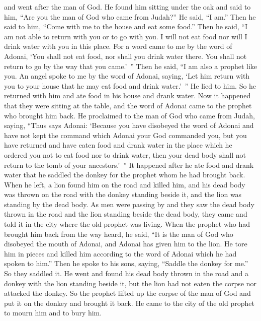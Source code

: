 \begin{biblechapter}
\verse and went after the man of God. He found him sitting under the oak and said to him, “Are you the man of God who came from Judah?” He said, “I am.”
\verse Then he said to him, “Come with me to the house and eat some food.”
\verse Then he said, “I am not able to return with you or to go with you. I will not eat food nor will I drink water with you in this place.
\verse For a word came to me by the word of Adonai, ‘You shall not eat food, nor shall you drink water there. You shall not return to go by the way that you came.’ ”
\verse Then he said, “I am also a prophet like you. An angel spoke to me by the word of Adonai, saying, ‘Let him return with you to your house that he may eat food and drink water.’ ” He lied to him.
\verse So he returned with him and ate food in his house and drank water.
\verse Now it happened that they were sitting at the table, and the word of Adonai came to the prophet who brought him back.
\verse He proclaimed to the man of God who came from Judah, saying, “Thus says Adonai: ‘Because you have disobeyed the word of Adonai and have not kept the command which Adonai your God commanded you,
\verse but you have returned and have eaten food and drank water in the place which he ordered you not to eat food nor to drink water, then your dead body shall not return to the tomb of your ancestors.’ ”
 It happened after he ate food and drank water that he saddled the donkey for the prophet whom he had brought back.
\verse When he left, a lion found him on the road and killed him, and his dead body was thrown on the road with the donkey standing beside it, and the lion was standing by the dead body.
\verse As men were passing by and they saw the dead body thrown in the road and the lion standing beside the dead body, they came and told it in the city where the old prophet was living.
\verse When the prophet who had brought him back from the way heard, he said, “It is the man of God who disobeyed the mouth of Adonai, and Adonai has given him to the lion. He tore him in pieces and killed him according to the word of Adonai which he had spoken to him.”
\verse Then he spoke to his sons, saying, “Saddle the donkey for me.” So they saddled it.
\verse He went and found his dead body thrown in the road and a donkey with the lion standing beside it, but the lion had not eaten the corpse nor attacked the donkey.
\verse So the prophet lifted up the corpse of the man of God and put it on the donkey and brought it back. He came to the city of the old prophet to mourn him and to bury him.

\end{biblechapter}
